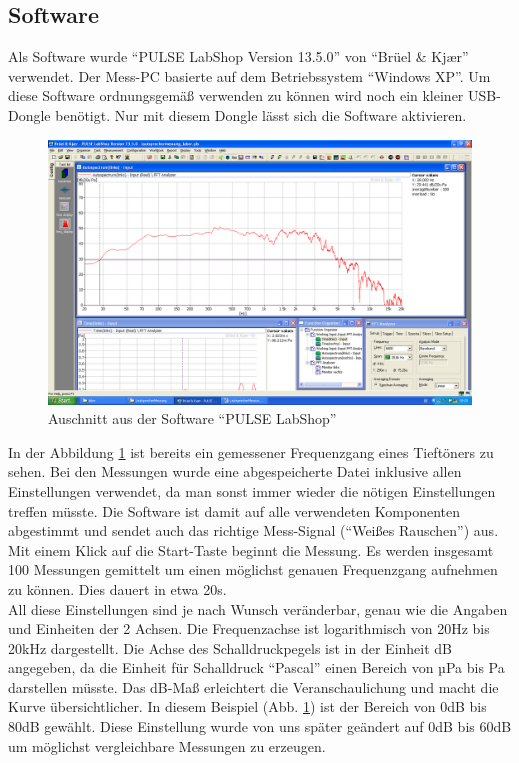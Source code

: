 \newpage
\subsection*{Software}\label{subsec:4.1.1}
Als Software wurde \enquote{PULSE LabShop Version 13.5.0} von \enquote{Brüel \& Kj\ae r} verwendet.
Der Mess-PC basierte auf dem Betriebssystem \enquote{Windows XP}.
Um diese Software ordnungsgemäß verwenden zu können wird noch ein kleiner USB-Dongle benötigt.
Nur mit diesem Dongle lässt sich die Software aktivieren.
\begin{figure} [H]
	\centering
	\includegraphics[width=1\textwidth]{img/LSMessung/VisatonMitSilikonMitWolle.png}
	\caption{Auschnitt aus der Software \enquote{PULSE LabShop}}
	\label{fig:4.1.1.1}
\end{figure}
In der Abbildung \ref{fig:4.1.1.1} ist bereits ein gemessener Frequenzgang eines Tieftöners zu sehen. Bei den Messungen wurde eine abgespeicherte Datei inklusive allen Einstellungen verwendet, da man sonst immer wieder die nötigen Einstellungen treffen müsste.
Die Software ist damit auf alle verwendeten Komponenten abgestimmt und sendet auch das richtige Mess-Signal (\enquote{Weißes Rauschen}) aus.
Mit einem Klick auf die Start-Taste beginnt die Messung.
Es werden insgesamt 100 Messungen gemittelt um einen möglichst genauen Frequenzgang aufnehmen zu können.
Dies dauert in etwa 20s.
\\
All diese Einstellungen sind je nach Wunsch veränderbar, genau wie die Angaben und Einheiten der 2 Achsen.
Die Frequenzachse ist logarithmisch von 20Hz bis 20kHz dargestellt.
Die Achse des Schalldruckpegels ist in der Einheit dB angegeben, da die Einheit für Schalldruck \enquote{Pascal} einen Bereich von µPa bis Pa darstellen müsste.
Das dB-Maß erleichtert die Veranschaulichung und macht die Kurve übersichtlicher.
In diesem Beispiel (Abb. \ref{fig:4.1.1.1}) ist der Bereich von 0dB bis 80dB gewählt.
Diese Einstellung wurde von uns später geändert auf 0dB bis 60dB um möglichst vergleichbare Messungen zu erzeugen.

